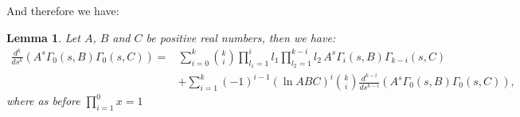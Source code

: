 \documentclass{article}
\theoremstyle{plain}
\newtheorem{lemma}{Lemma}
\begin{document}
And therefore we have:

\begin{lemma}\label{computation}
Let $A$, $B$ and $C$ be positive real numbers, then we have:
\begin{equation}
\begin{split}
\frac{d^k}{ds^k} \left(A^s \Gamma_0(s,B) \Gamma_0(s,C)\right)= & \sum_{i=0}^{k}\binom{k}{i} \prod_{l_1=1}^{i} l_1 \prod_{l_2=1}^{k-i} l_2 \, A^{s} \Gamma_{i}(s,B) \Gamma_{k-i}(s, C)\\
&+\sum_{i=1}^{k} (-1)^{i-1} (\ln ABC)^i \binom{k}{i}\frac{d^{k-i}}{ds^{k-i}} (A^s \Gamma_0(s,B) \Gamma_0(s,C)),
\end{split}
\end{equation}
where as before $\prod_{i=1}^{0} x =1$
\end{lemma}
\end{document}
